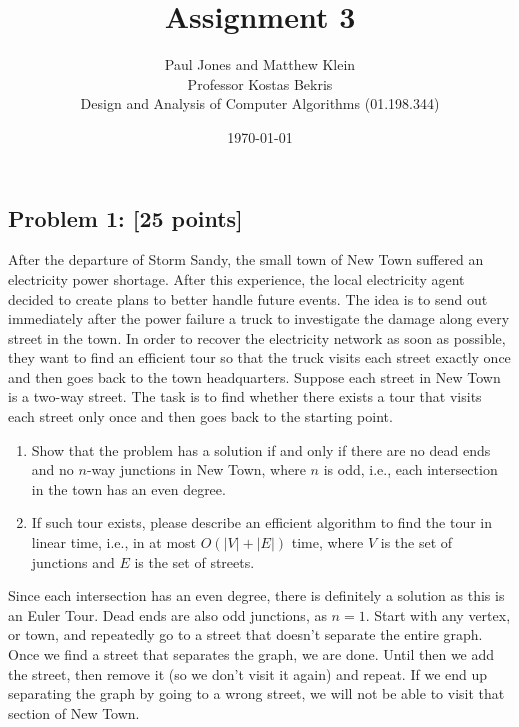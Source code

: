 \documentclass[11pt]{article}
\title{Assignment 3}
\author{Paul Jones and Matthew Klein \\
		Professor Kostas Bekris\\
		Design and Analysis of Computer Algorithms (01.198.344)}
\date{\today}
\begin{document}
\subsection*{Problem 1: [25 points]} After the departure of Storm
Sandy, the small town of New Town suffered an electricity power
shortage. After this experience, the local electricity agent decided
to create plans to better handle future events. The idea is to send
out immediately after the power failure a truck to investigate the
damage along every street in the town. In order to recover the
electricity network as soon as possible, they want to find an
efficient tour so that the truck visits each street exactly once and
then goes back to the town headquarters. Suppose each street in New
Town is a two-way street. The task is to find whether there exists a
tour that visits each street only once and then goes back to the
starting point.\\

\begin{enumerate}[label=\Alph*.]
\item  Show that the problem has a solution if and only if
there are no dead ends and no $n$-way junctions in New Town, where $n$
is odd, i.e., each intersection in the town has an even degree.

\item  If such tour exists, please describe an efficient
algorithm to find the tour in linear time, i.e., in at most $O(|V| +
|E|)$ time, where $V$ is the set of junctions and $E$ is the set of
streets.
\end{enumerate}


Since each intersection has an even degree, there is definitely a solution as this is an Euler Tour. Dead ends are also odd junctions, as $n = 1$. Start with any vertex, or town, and repeatedly go to a street that doesn't separate the entire graph. Once we find a street that separates the graph, we are done. Until then we add the street, then remove it (so we don't visit it again) and repeat. If we end up separating the graph by going to a wrong street, we will not be able to visit that section of New Town.


\end{document}
